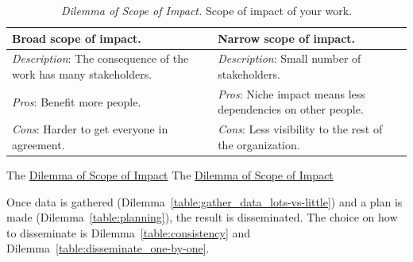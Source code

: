 \begin{center}
\begin{table}[H] %
\begin{tabular}{ | m{\dilemmatablewidth}| m{\dilemmatablewidth} | } 
  \hline
  \textbf{Broad scope of impact.} &
  \textbf{Narrow scope of impact.} \\
  \hline
  \textit{Description}: The consequence of the work has many stakeholders. &
  \textit{Description}: Small number of stakeholders. \\  
  \hline
  \textit{Pros}: Benefit more people. &
  \textit{Pros}: Niche impact means less dependencies on other people. \\
  \hline
  \textit{Cons}: Harder to get everyone in agreement. & 
  \textit{Cons}: Less visibility to the rest of the organization. \\
  \hline
\end{tabular}
\caption{
\textit{Dilemma of Scope of Impact.}
Scope of impact of your work. 
}
\end{table}
\label{table:scope_broad-vs-narrow}
\end{center}

The \href{table:scope_broad-vs-narrow}{Dilemma of Scope of Impact}
The \href{table:scope_broad-vs-narrow}{Dilemma of Scope of Impact}


Once data is gathered (Dilemma~\ref{table:gather_data_lots-vs-little}) and a plan is made (Dilemma~\ref{table:planning}), the result is disseminated. The choice on how to disseminate is Dilemma~\ref{table:consistency} and Dilemma~\ref{table:disseminate_one-by-one}.

